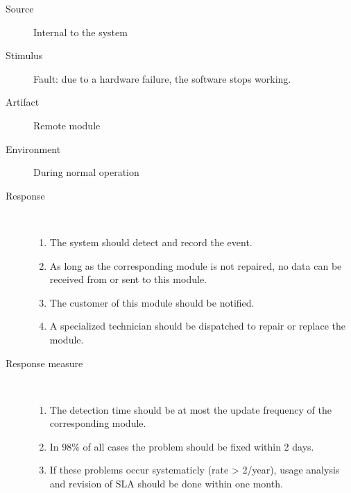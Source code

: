 \begin{description}
	\item[Source] Internal to the system
	\item[Stimulus] Fault: due to a hardware failure, the software stops working.
	\item[Artifact] Remote module 
	\item[Environment] During normal operation 
	\item[Response] \ %
	\begin{enumerate}
	  \item The system should detect and record the event.
	  \item As long as the corresponding module is not repaired, no data can
	  be received from or sent to this module.
	  \item The customer of this module should be notified.
	  \item A specialized technician should be dispatched to repair or replace the
	  module.
	\end{enumerate}
	\item[Response measure] \ 
	\begin{enumerate}
	  \item The detection time should be at most the update frequency of the
	  corresponding module.
	  \item In 98\% of all cases the problem should be fixed within 2 days.
	  \item If these problems occur systematicly (rate > 2/year), usage
	  analysis and revision of SLA should be done within one month.
	\end{enumerate}
\end{description}